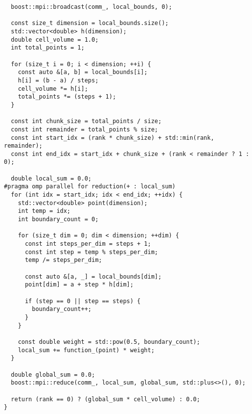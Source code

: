 \documentclass[a4paper,12pt]{article}
\begin{document}
\begin{lstlisting}
  boost::mpi::broadcast(comm_, local_bounds, 0);

  const size_t dimension = local_bounds.size();
  std::vector<double> h(dimension);
  double cell_volume = 1.0;
  int total_points = 1;

  for (size_t i = 0; i < dimension; ++i) {
    const auto &[a, b] = local_bounds[i];
    h[i] = (b - a) / steps;
    cell_volume *= h[i];
    total_points *= (steps + 1);
  }

  const int chunk_size = total_points / size;
  const int remainder = total_points % size;
  const int start_idx = (rank * chunk_size) + std::min(rank, remainder);
  const int end_idx = start_idx + chunk_size + (rank < remainder ? 1 : 0);

  double local_sum = 0.0;
#pragma omp parallel for reduction(+ : local_sum)
  for (int idx = start_idx; idx < end_idx; ++idx) {
    std::vector<double> point(dimension);
    int temp = idx;
    int boundary_count = 0;

    for (size_t dim = 0; dim < dimension; ++dim) {
      const int steps_per_dim = steps + 1;
      const int step = temp % steps_per_dim;
      temp /= steps_per_dim;

      const auto &[a, _] = local_bounds[dim];
      point[dim] = a + step * h[dim];

      if (step == 0 || step == steps) {
        boundary_count++;
      }
    }

    const double weight = std::pow(0.5, boundary_count);
    local_sum += function_(point) * weight;
  }

  double global_sum = 0.0;
  boost::mpi::reduce(comm_, local_sum, global_sum, std::plus<>(), 0);

  return (rank == 0) ? (global_sum * cell_volume) : 0.0;
}
\end{lstlisting}
\end{document}
